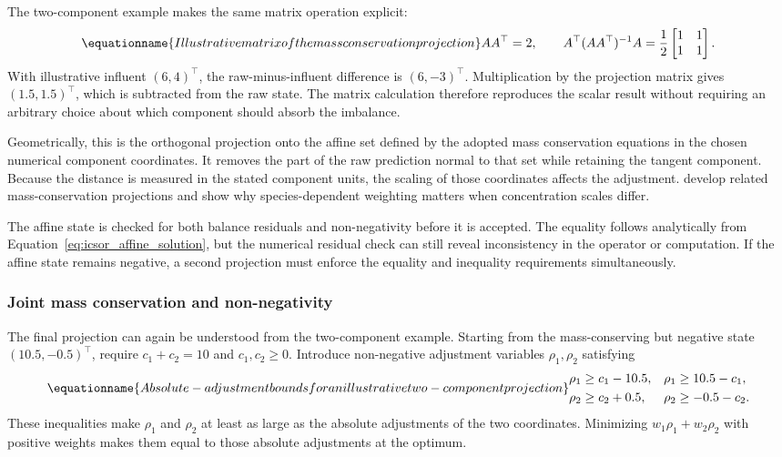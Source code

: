 The two-component example makes the same matrix operation explicit:
\begin{equation}
\equationname{Illustrative matrix of the mass conservation projection}
\label{eq:icsor_small_affine_matrix}
AA^\top=2,
\qquad
A^\top(AA^\top)^{-1}A
=\frac{1}{2}\begin{bmatrix}1&1\\1&1\end{bmatrix}.
\end{equation}
With illustrative influent \((6,4)^\top\), the raw-minus-influent difference is \((6,-3)^\top\). Multiplication by the projection matrix gives \((1.5,1.5)^\top\), which is subtracted from the raw state. The matrix calculation therefore reproduces the scalar result without requiring an arbitrary choice about which component should absorb the imbalance.

Geometrically, this is the orthogonal projection onto the affine set defined by the adopted mass conservation equations in the chosen numerical component coordinates. It removes the part of the raw prediction normal to that set while retaining the tangent component. Because the distance is measured in the stated component units, the scaling of those coordinates affects the adjustment. \citet{SturmSilva2024} develop related mass-conservation projections and show why species-dependent weighting matters when concentration scales differ.

The affine state is checked for both balance residuals and non-negativity before it is accepted. The equality follows analytically from Equation~\eqref{eq:icsor_affine_solution}, but the numerical residual check can still reveal inconsistency in the operator or computation. If the affine state remains negative, a second projection must enforce the equality and inequality requirements simultaneously.

\subsubsection{Joint mass conservation and non-negativity}

The final projection can again be understood from the two-component example. Starting from the mass-conserving but negative state \((10.5,-0.5)^\top\), require \(c_1+c_2=10\) and \(c_1,c_2\geq0\). Introduce non-negative adjustment variables \(\rho_1,\rho_2\) satisfying
\begin{equation}
\equationname{Absolute-adjustment bounds for an illustrative two-component projection}
\label{eq:icsor_scalar_absolute_constraints}
\begin{aligned}
\rho_1&\geq c_1-10.5,&\rho_1&\geq10.5-c_1,\\
\rho_2&\geq c_2+0.5,&\rho_2&\geq-0.5-c_2.
\end{aligned}
\end{equation}
These inequalities make \(\rho_1\) and \(\rho_2\) at least as large as the absolute adjustments of the two coordinates. Minimizing \(w_1\rho_1+w_2\rho_2\) with positive weights makes them equal to those absolute adjustments at the optimum.

